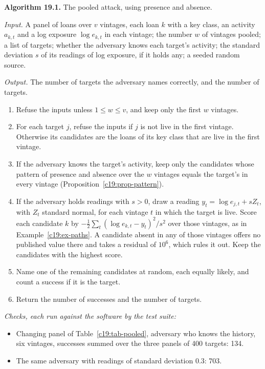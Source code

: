 \begin{mdframed}[linecolor=gray!60,backgroundcolor=gray!5]
\textbf{Algorithm 19.1.} The pooled attack, using presence and absence.\par\smallskip
\textit{Input.} A panel of loans over $v$ vintages, each loan $k$ with a key class, an activity $a_{k,t}$ and a log
exposure $\log e_{k,t}$ in each vintage; the number $w$ of vintages pooled; a list of targets; whether the
adversary knows each target's activity; the standard deviation $s$ of its readings of log exposure,
if it holds any; a seeded random source.\par
\textit{Output.} The number of targets the adversary names correctly, and the number of targets.
\begin{enumerate}
\item Refuse the inputs unless $1\le w\le v$, and keep only the first $w$ vintages.
\item For each target $j$, refuse the inputs if $j$ is not live in the first vintage. Otherwise its candidates
are the loans of its key class that are live in the first vintage.
\item If the adversary knows the target's activity, keep only the candidates whose pattern of presence and absence over the $w$ vintages equals the target's in every vintage (Proposition~\ref{c19:prop-pattern}).
\item If the adversary holds readings with $s>0$, draw a reading $y_t=\log e_{j,t}+sZ_t$, with $Z_t$
standard normal, for each vintage $t$ in which the target is live. Score each candidate $k$ by
$-\tfrac12\sum_t(\log e_{k,t}-y_t)^2/s^2$ over those vintages, as in Example~\ref{c19:ex-paths}. A candidate absent in any
of those vintages offers no published value there and takes a residual of $10^6$, which rules it
out. Keep the candidates with the highest score.
\item Name one of the remaining candidates at random, each equally likely, and count a success
if it is the target.
\item Return the number of successes and the number of targets.
\end{enumerate}
\textit{Checks, each run against the software by the test suite:}
\begin{itemize}
\item Changing panel of Table~\ref{c19:tab-pooled}, adversary who knows the history, six vintages, successes summed over the three panels of 400 targets: 134.
\item The same adversary with readings of standard deviation $0.3$: 703.

\end{itemize}
\end{mdframed}
